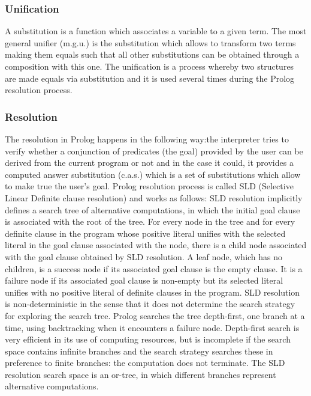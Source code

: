 \subsubsection{Unification}\label{subsubsec:Unification}
A substitution is a function which associates a variable to a given term. The most general unifier (m.g.u.) is the substitution which allows to transform two terms making them equals
such that all other substitutions can be obtained through a composition with this one.
The unification is a process whereby two structures are made equals via substitution and it is used several times during the Prolog resolution process. 

\subsubsection{Resolution}\label{subsubsec:resolution}
The resolution in Prolog happens in the following way:the interpreter tries to verify whether a conjunction of predicates (the goal) provided by the user can be derived
from the current program or not and in the case it could, it provides a computed answer substitution (c.a.s.) which is a set of substitutions which allow to make true the user's goal.\newline
Prolog resolution process is called SLD (Selective Linear Definite clause resolution) and works as follows:\newline
SLD resolution implicitly defines a search tree of alternative computations, in which the initial goal clause is associated with the root of the tree. For every node in the tree and for every definite clause in the program whose positive literal unifies with the selected literal in the goal clause associated with the node, there is a child node associated with the goal clause obtained by SLD resolution.
A leaf node, which has no children, is a success node if its associated goal clause is the empty clause. It is a failure node if its associated goal clause is non-empty but its selected literal unifies with no positive literal of definite clauses in the program.
SLD resolution is non-deterministic in the sense that it does not determine the search strategy for exploring the search tree. Prolog searches the tree depth-first, one branch at a time, using backtracking when it encounters a failure node. Depth-first search is very efficient in its use of computing resources, but is incomplete if the search space contains infinite branches and the search strategy searches these in preference to finite branches: the computation does not terminate.
The SLD resolution search space is an or-tree, in which different branches represent alternative computations.\cite{Gallier1985LogicFC}

